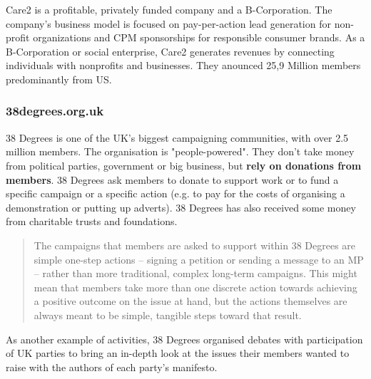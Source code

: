 Care2 is a profitable, privately funded company and a B-Corporation. The company's business model is focused on pay-per-action lead generation for non-profit organizations and CPM sponsorships for responsible consumer brands. As a B-Corporation or social enterprise, Care2 generates revenues by connecting individuals with nonprofits and businesses.\citep{Care22014} They anounced 25,9 Million members predominantly from US.

\subsubsection*{38degrees.org.uk}
38 Degrees is one of the UK's biggest campaigning communities, with over 2.5 million members. The organisation is "people-powered". They don't take money from political parties, government or big business, but \textbf{rely on donations from members}. 38 Degrees ask members to donate to support work or to fund a specific campaign or a specific action (e.g. to pay for the costs of organising a demonstration or putting up adverts). 38 Degrees has also received some money from charitable trusts and foundations. \citep{38degrees2014}
\par\vspace{0.2cm}
\begin{quote}
The campaigns that members are asked to support within 38 Degrees are simple one-step actions – signing a petition or sending a message to an MP – rather than more traditional, complex long-term campaigns.
This might mean that members take more than one discrete action towards achieving a positive outcome on the issue at hand, but the actions themselves are always meant to be simple, tangible steps toward that result. \citep{Puckett2011}
\end{quote}
As another example of activities, 38 Degrees organised debates with participation of UK parties to bring an in-depth look at the issues their members wanted to raise with the authors of each party's manifesto. \citep{Guardian2010}

